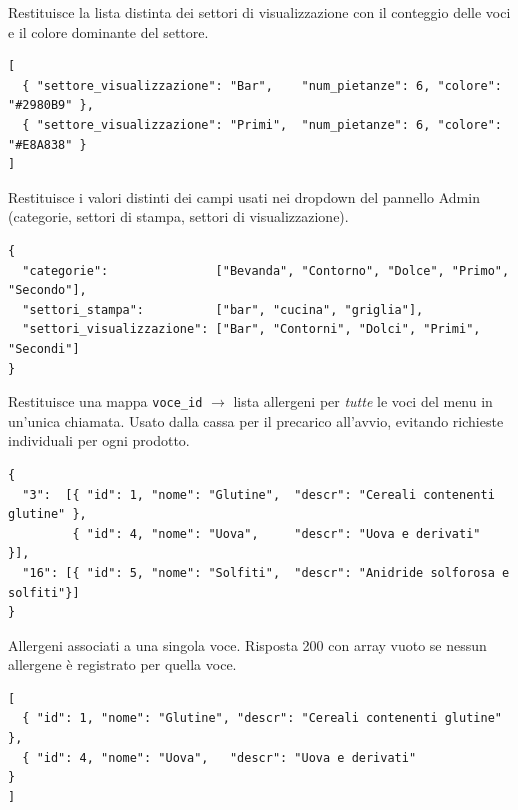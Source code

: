 
Restituisce la lista distinta dei settori di visualizzazione con il conteggio
delle voci e il colore dominante del settore.

\begin{lstlisting}[style=json]
[
  { "settore_visualizzazione": "Bar",    "num_pietanze": 6, "colore": "#2980B9" },
  { "settore_visualizzazione": "Primi",  "num_pietanze": 6, "colore": "#E8A838" }
]
\end{lstlisting}


Restituisce i valori distinti dei campi usati nei dropdown del pannello Admin
(categorie, settori di stampa, settori di visualizzazione).

\begin{lstlisting}[style=json]
{
  "categorie":               ["Bevanda", "Contorno", "Dolce", "Primo", "Secondo"],
  "settori_stampa":          ["bar", "cucina", "griglia"],
  "settori_visualizzazione": ["Bar", "Contorni", "Dolci", "Primi", "Secondi"]
}
\end{lstlisting}


Restituisce una mappa \texttt{voce\_id} $\to$ lista allergeni per \emph{tutte}
le voci del menu in un'unica chiamata. Usato dalla cassa per il precarico
all'avvio, evitando richieste individuali per ogni prodotto.

\begin{lstlisting}[style=json]
{
  "3":  [{ "id": 1, "nome": "Glutine",  "descr": "Cereali contenenti glutine" },
         { "id": 4, "nome": "Uova",     "descr": "Uova e derivati"             }],
  "16": [{ "id": 5, "nome": "Solfiti",  "descr": "Anidride solforosa e solfiti"}]
}
\end{lstlisting}


Allergeni associati a una singola voce. Risposta 200 con array vuoto se nessun
allergene è registrato per quella voce.

\begin{lstlisting}[style=json]
[
  { "id": 1, "nome": "Glutine", "descr": "Cereali contenenti glutine" },
  { "id": 4, "nome": "Uova",   "descr": "Uova e derivati"             }
]
\end{lstlisting}



